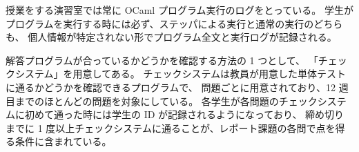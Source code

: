 授業をする演習室では常に OCaml プログラム実行のログをとっている。
学生がプログラムを実行する時には必ず、ステッパによる実行と通常の実行のどちらも、
個人情報が特定されない形でプログラム全文と実行ログが記録される。

解答プログラムが合っているかどうかを確認する方法の 1 つとして、
「チェックシステム」を用意してある。
チェックシステムは教員が用意した単体テストに通るかどうかを確認できるプログラムで、
問題ごとに用意されており、12 週目までのほとんどの問題を対象にしている。
各学生が各問題のチェックシステムに初めて通った時には学生の ID が記録されるようになっており、
締め切りまでに 1 度以上チェックシステムに通ることが、レポート課題の各問で点を得る条件に含まれている。
